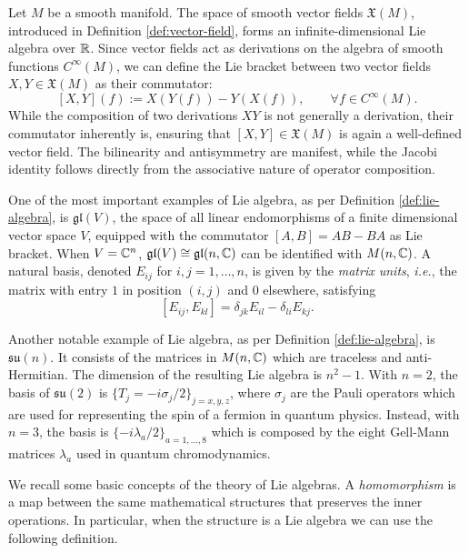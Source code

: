 \begin{example}\label{ex:lie-fields}
	Let $M$ be a smooth manifold. The space of smooth vector fields $\mathfrak{X}(M)$, introduced in Definition \ref{def:vector-field}, forms an infinite-dimensional Lie algebra over $\mathbb{R}$. Since vector fields act as derivations on the algebra of smooth functions $C^\infty(M)$, we can define the Lie bracket between two vector fields $X, Y \in \mathfrak{X}(M)$ as their commutator:
	\[
	[X, Y](f) := X(Y(f)) - Y(X(f)), \qquad \forall f \in C^\infty(M).
	\]
	While the composition of two derivations $XY$ is not generally a derivation, their commutator inherently is, ensuring that $[X,Y] \in \mathfrak{X}(M)$ is again a well-defined vector field. The bilinearity and antisymmetry are manifest, while the Jacobi identity follows directly from the associative nature of operator composition.
\end{example}

\begin{example}
	One of the most important examples of Lie algebra, as per Definition \ref{def:lie-algebra}, is $\mathfrak{gl}(V)$, the space of all linear endomorphisms of a finite dimensional vector space $V$, equipped with the commutator $[A,B] = AB - BA$ as Lie bracket. When $V = \mathbb{C}^n$, $\mathfrak{gl}(V) \cong \mathfrak{gl}(n,\mathbb{C})$ can be identified with $M(n,\mathbb{C})$. A natural basis, denoted $E_{ij}$ for $i,j = 1,\dots,n$, is given by the \textit{matrix units}, \textit{i.e.}, the matrix with entry $1$ in position $(i,j)$ and $0$ elsewhere, satisfying $$[E_{ij}, E_{kl}] = \delta_{jk}E_{il} - \delta_{li}E_{kj}.$$
\end{example}

\begin{example}\label{ex:su-n}
	Another notable example of Lie algebra, as per Definition \ref{def:lie-algebra}, is $\mathfrak{su}(n)$. It consists of the matrices in $M(n, \mathbb{C})$ which are traceless and anti-Hermitian. The dimension of the resulting Lie algebra is $n^2 -1$. With $n=2$, the basis of $\mathfrak{su}(2)$ is $\{T_j = -i\sigma_j/2\}_{j=x,y,z}$, where $\sigma_j$ are the Pauli operators which are used for representing the spin of a fermion in quantum physics. Instead, with $n=3$, the basis is $\{-i\lambda_a/2\}_{a=1,...,8}$ which is composed by the eight Gell-Mann matrices $\lambda_a$ used in quantum chromodynamics.
\end{example}

We recall some basic concepts of the theory of Lie algebras.
A \textit{homomorphism} is a map between the same mathematical structures that preserves the inner operations. In particular, when the structure is a Lie algebra we can use the following definition.

